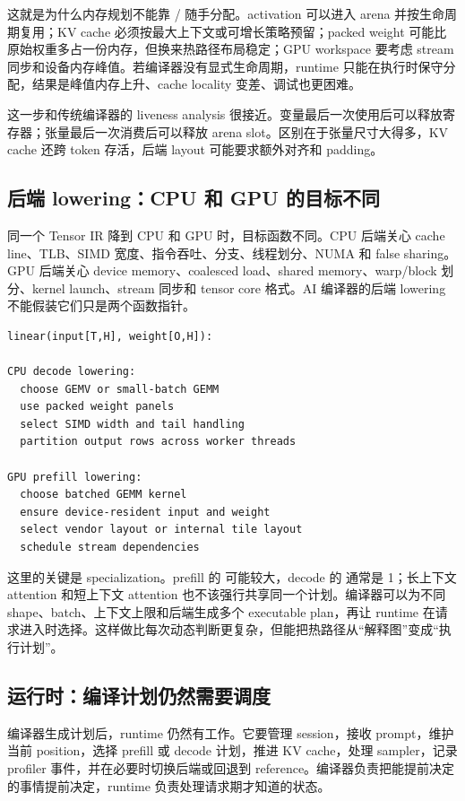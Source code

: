 这就是为什么内存规划不能靠 / 随手分配。activation 可以进入 arena 并按生命周期复用；KV cache 必须按最大上下文或可增长策略预留；packed weight 可能比原始权重多占一份内存，但换来热路径布局稳定；GPU workspace 要考虑 stream 同步和设备内存峰值。若编译器没有显式生命周期，runtime 只能在执行时保守分配，结果是峰值内存上升、cache locality 变差、调试也更困难。

这一步和传统编译器的 liveness analysis 很接近。变量最后一次使用后可以释放寄存器；张量最后一次消费后可以释放 arena slot。区别在于张量尺寸大得多，KV cache 还跨 token 存活，后端 layout 可能要求额外对齐和 padding。

\subsection{后端 lowering：CPU 和 GPU 的目标不同}

同一个 Tensor IR 降到 CPU 和 GPU 时，目标函数不同。CPU 后端关心 cache line、TLB、SIMD 宽度、指令吞吐、分支、线程划分、NUMA 和 false sharing。GPU 后端关心 device memory、coalesced load、shared memory、warp/block 划分、kernel launch、stream 同步和 tensor core 格式。AI 编译器的后端 lowering 不能假装它们只是两个函数指针。

\begin{lstlisting}[numbers=none,caption={同一 linear 算子的两个 lowering 方向}]
linear(input[T,H], weight[O,H]):

CPU decode lowering:
  choose GEMV or small-batch GEMM
  use packed weight panels
  select SIMD width and tail handling
  partition output rows across worker threads

GPU prefill lowering:
  choose batched GEMM kernel
  ensure device-resident input and weight
  select vendor layout or internal tile layout
  schedule stream dependencies
\end{lstlisting}

这里的关键是 specialization。prefill 的  可能较大，decode 的  通常是 1；长上下文 attention 和短上下文 attention 也不该强行共享同一个计划。编译器可以为不同 shape、batch、上下文上限和后端生成多个 executable plan，再让 runtime 在请求进入时选择。这样做比每次动态判断更复杂，但能把热路径从“解释图”变成“执行计划”。

\subsection{运行时：编译计划仍然需要调度}

编译器生成计划后，runtime 仍然有工作。它要管理 session，接收 prompt，维护当前 position，选择 prefill 或 decode 计划，推进 KV cache，处理 sampler，记录 profiler 事件，并在必要时切换后端或回退到 reference。编译器负责把能提前决定的事情提前决定，runtime 负责处理请求期才知道的状态。

